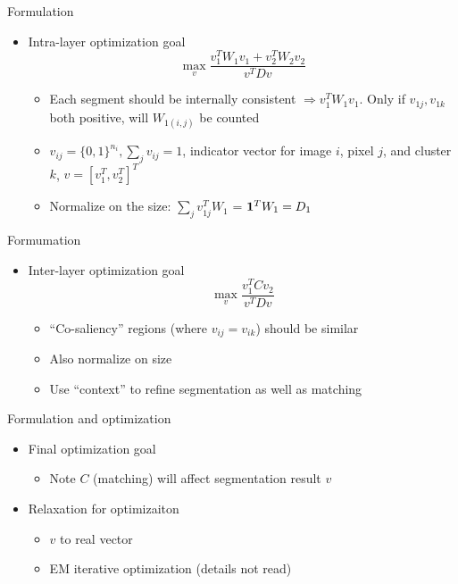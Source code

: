 \documentclass[12pt]{beamer}
\begin{document}
\begin{frame}{Formulation}
    \begin{itemize}
        \item Intra-layer optimization goal
        \[\max_v \frac{v_1^TW_1v_1 + v_2^TW_2v_2}{v^TDv}\]
        \begin{itemize}
            \item Each segment should be internally consistent $\Rightarrow v_1^TW_1v_1$. Only if $v_{1j}, v_{1k}$ both positive, will $W_{1(i,j)}$ be counted
            \item $v_{ij} = \{0, 1\}^{n_i}, \sum_j v_{ij} = 1$, indicator vector for image $i$, pixel $j$, and cluster $k$, $v = [v_1^T, v_2^T]^T$
            \item Normalize on the size: $\sum_j v_{1j}^TW_1$ = ${\bf 1}^TW_1 = D_1$
        \end{itemize}
    \end{itemize}
\end{frame}

\begin{frame}{Formumation}
    \begin{itemize}
        \item Inter-layer optimization goal
        \[\max_v \frac{v_1^TCv_2}{v^TDv}\]
        \begin{itemize}
            \item ``Co-saliency'' regions (where $v_{ij} = v_{ik}$) should be similar
            \item Also normalize on size
            \item Use ``context'' to refine segmentation as well as matching
        \end{itemize}
    \end{itemize}
\end{frame}

\begin{frame}{Formulation and optimization}
    \begin{itemize}
        \item Final optimization goal
        \begin{itemize}
        \[F(v, C) = \text{IntraIS}(v, C) + \text{InterIS}(v, C)\]
            \item Note $C$ (matching) will affect segmentation result $v$
        \end{itemize}
        \item Relaxation for optimizaiton
        \begin{itemize}
            \item $v$ to real vector
            \item EM iterative optimization (details not read)
        \end{itemize}
    \end{itemize}
\end{frame}
\end{document}
